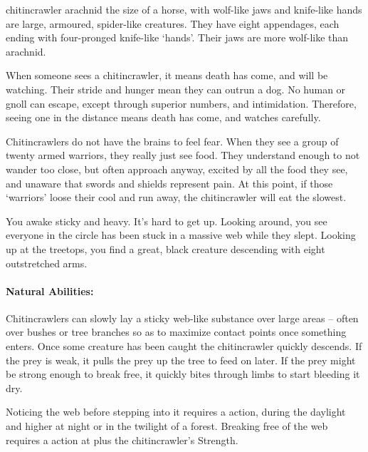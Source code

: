 \begin{multicols}{2}

  {chitincrawler}%
  {arachnid the size of a horse, with wolf-like jaws and knife-like hands}%
are large, armoured, spider-like creatures.
They have eight appendages, each ending with four-pronged knife-like `hands'.
Their jaws are more wolf-like than arachnid.

When someone sees a chitincrawler, it means death has come, and will be watching.
Their stride and hunger mean they can outrun a dog.
No human or gnoll can escape, except through superior numbers, and intimidation.
Therefore, seeing one in the distance means death has come, and watches carefully.

Chitincrawlers do not have the brains to feel fear.
When they see a group of twenty armed warriors, they really just see food.
They understand enough to not wander too close, but often approach anyway, excited by all the food they see, and unaware that swords and shields represent pain.
At this point, if those `warriors' loose their cool and run away, the chitincrawler will eat the slowest.

\chitincrawler

\begin{boxtext}
  You awake sticky and heavy.
  It's hard to get up.
  Looking around, you see everyone in the circle has been stuck in a massive web while they slept.
  Looking up at the treetops, you find a great, black creature descending with eight outstretched arms.
\end{boxtext}

\paragraph{Natural Abilities:} Chitincrawlers can slowly lay a sticky web-like substance over large areas -- often over bushes or tree branches so as to maximize contact points once something enters.
Once some creature has been caught the chitincrawler quickly descends.
If the prey is weak, it pulls the prey up the tree to feed on later.
If the prey might be strong enough to break free, it quickly bites through limbs to start bleeding it dry.

Noticing the web before stepping into it requires a  action, \tn[7] during the daylight and higher at night or in the twilight of a forest.
Breaking free of the web requires a  action at \tn[7] plus the chitincrawler's Strength.


\end{multicols}
